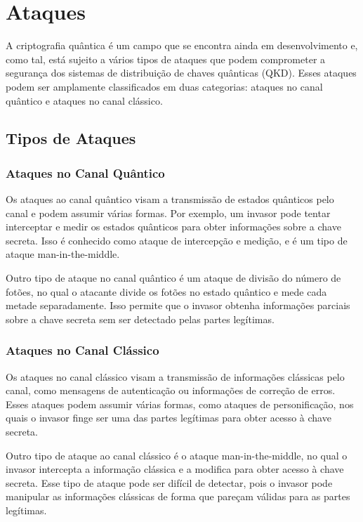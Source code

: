 \chapter{Ataques}

A criptografia quântica é um campo que se encontra ainda em desenvolvimento e, como tal, está sujeito a vários tipos de ataques que podem comprometer a segurança dos sistemas de distribuição de chaves quânticas (QKD). Esses ataques podem ser amplamente classificados em duas categorias: ataques no canal quântico e ataques no canal clássico.

\section{Tipos de Ataques}

\subsection{Ataques no Canal Quântico}

Os ataques ao canal quântico visam a transmissão de estados quânticos pelo canal e podem assumir várias formas. Por exemplo, um invasor pode tentar interceptar e medir os estados quânticos para obter informações sobre a chave secreta. Isso é conhecido como ataque de intercepção e medição, e é um tipo de ataque man-in-the-middle.

Outro tipo de ataque no canal quântico é um ataque de divisão do número de fotões, no qual o atacante divide os fotões no estado quântico e mede cada metade separadamente. Isso permite que o invasor obtenha informações parciais sobre a chave secreta sem ser detectado pelas partes legítimas.

\subsection{Ataques no Canal Clássico}

Os ataques no canal clássico visam a transmissão de informações clássicas pelo canal, como mensagens de autenticação ou informações de correção de erros. Esses ataques podem assumir várias formas, como ataques de personificação, nos quais o invasor finge ser uma das partes legítimas para obter acesso à chave secreta.

Outro tipo de ataque ao canal clássico é o ataque man-in-the-middle, no qual o invasor intercepta a informação clássica e a modifica para obter acesso à chave secreta. Esse tipo de ataque pode ser difícil de detectar, pois o invasor pode manipular as informações clássicas de forma que pareçam válidas para as partes legítimas.

